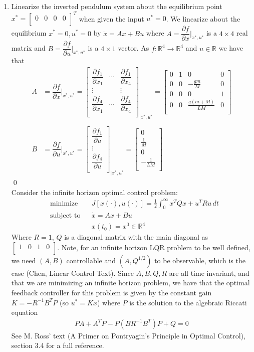 \documentclass[10pt]{article}
\newcommand{\mat}[2][ccccccccccccccc]{\left [\!\!\begin{array}{#1} #2\\ \end{array} \!\!\right]}
\newcommand{\libzptrl}[2]{\dfrac{\partial #1}{\partial #2} }
\newcommand{\eval}[2]{\bigg|_{#1}^{#2}}
\newcommand{\inv}{^{-1}}
\newcommand{\bbr}{\mathbb{R}}
\begin{document}
\begin{enumerate}[leftmargin=*]
   \item Linearize the inverted pendulum system about the equilibrium point $x^*=\mat{0&0&0&0}^T$ when given the input $u^*=0$.  We linearize about the equilibrium $x^*=0,u^*=0$ by $\dot x = Ax+Bu$ where $A=\libzptrl{f}{x}\eval{x^*,u^*}{}$ is a $4\times4$ real matrix and $B=\libzptrl{f}{u}\eval{x^*,u^*}{}$ is a $4\times1$ vector.  As $f:\bbr^4\longrightarrow\bbr^4$ and $u\in\bbr$ we have that
       \begin{align*}
            A &= \libzptrl{f}{x}\eval{x^*,u^*}{}
               = {\mat{ \libzptrl{f_1}{x_1}&\cdots&\libzptrl{f_1}{x_4} \\
                       \vdots & &\vdots \\
                       \libzptrl{f_4}{x_1}&\cdots&\libzptrl{f_4}{x_4} }}_{|x^*,u^*}
               = \mat{0 & 1 & 0 & 0 \\
                      0 & 0 & -\frac{gm}{M} & 0 \\
                      0 & 0 & 0 & 1 \\
                      0 & 0 & \frac{g(m+M)}{LM} & 0} \\\\
            B &=  \libzptrl{f}{u}\eval{x^*,u^*}{} = {\mat{\libzptrl{f_1}{u} \\ \vdots \\ \libzptrl{f_4}{u}}}_{|x^*,u^*}
              = \mat{0 \\ \frac{1}{M} \\ 0 \\ -\frac{1}{LM}}
       \end{align*}
\qed\\
   Consider the infinite horizon optimal control problem:
   \begin{equation*}
        \begin{aligned}
            & {\text{minimize}} & &J[x(\cdot),u(\cdot)]=\frac{1}{2}\int_0^\infty x^TQx+u^TRu\,dt \\
            & \text{subject to} & &\dot x = Ax+Bu \\
                                & & & x(t_0)=x^0\in\bbr^4
        \end{aligned}
      \end{equation*}
   Where $R=1$, $Q$ is a diagonal matrix with the main diagonal as $\mat{1 & 0 & 1 & 0}$.  Note, for an infinite horizon LQR problem to be well defined, we need $(A,B)$ controllable and $(A,Q^{1/2})$ to be observable, which is the case (Chen, Linear Control Text).  Since $A, B, Q, R$ are all time invariant, and that we are minimizing an infinite horizon problem, we have that the optimal feedback controller for this problem is given by the constant gain $K=-R\inv B^TP$ (so $u^*=Kx$) where $P$ is the solution to the algebraic Riccati equation
   \begin{align*}
        PA+A^TP-P(BR\inv B^T)P+Q=0
   \end{align*}
   See M. Ross' text (A Primer on Pontryagin's Principle in Optimal Control), section 3.4 for a full reference.


\end{enumerate}
\end{document}

